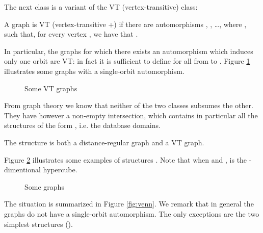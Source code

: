 \documentclass{llncs}
\begin{document}
The next class is a variant of the VT (vertex-transitive) class: 

\begin{definition}
A graph  is   VT (vertex-transitive +) if there are  automorphisms , , \ldots , where ,  such that, for every vertex , 
we have that . 
\end{definition}

In particular, the graphs  for which there exists an automorphism  which induces only one orbit are VT: in fact it is sufficient to define  for all  from  to . Figure \ref{fig:hexagons} illustrates some graphs with a single-orbit automorphism. 


\begin{figure}[th]\centering
		\qquad
		\qquad
		\caption{Some VT graphs}
		\label{fig:hexagons}	
	\end{figure}
	
From graph theory we know that neither of the  two classes subsumes the other. They have however a non-empty intersection, which contains in particular  all  the structures of the form , i.e. the database domains.

\begin{proposition}\label{prop:grap-databases}
The structure  is both a distance-regular graph  and a VT graph.
\end{proposition}

Figure \ref{fig:hypercubes} illustrates some examples of structures  . Note that when  and ,  is the -dimentional hypercube. 

\begin{figure}[th]\centering
		\qquad
		\caption{Some  graphs}
		\label{fig:hypercubes}	
		\vspace{.5cm}
	\end{figure}

The situation is summarized in Figure \ref{fig:venn}. We remark that in general the graphs  do not have a single-orbit automorphism. The only exceptions are the two simplest structures (). 
\end{document}
